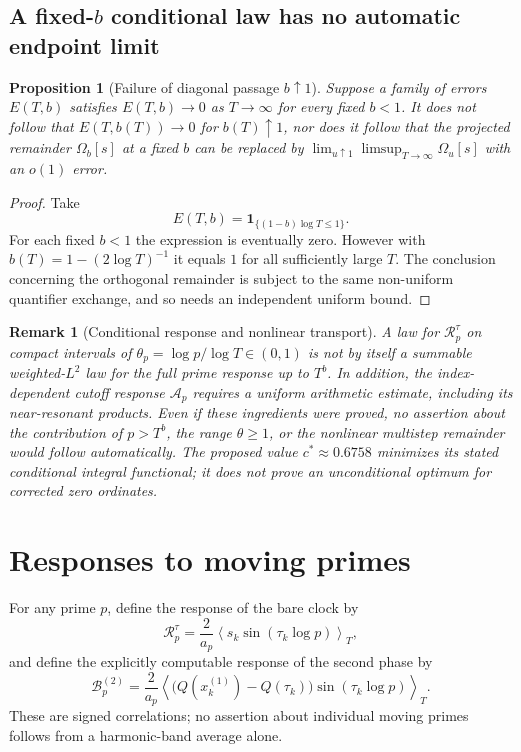 \documentclass[11pt,reqno]{amsart}
\numberwithin{equation}{section}
\newtheorem{proposition}[theorem]{Proposition}
\newtheorem{remark}[theorem]{Remark}
\newcommand{\av}[1]{\left\langle #1\right\rangle_T}
\begin{document}
\subsection{A fixed-$b$ conditional law has no automatic endpoint limit}
\begin{proposition}[Failure of diagonal passage $b\uparrow1$]
\label{prop:bendpoint}
Suppose a family of errors $E(T,b)$ satisfies
$E(T,b)\to0$ as $T\to\infty$ for every \emph{fixed} $b<1$.
It does not follow that $E(T,b(T))\to0$ for
$b(T)\uparrow1$, nor does it follow that the projected
remainder $\Omega_b[s]$ at a fixed $b$ can be replaced by
$\lim_{u\uparrow1}\limsup_{T\to\infty}\Omega_u[s]$ with
an $o(1)$ error.
\end{proposition}
\begin{proof}
Take
\[
E(T,b)=\mathbf1_{\{(1-b)\log T\le1\}}.
\]
For each fixed $b<1$ the expression is eventually zero.
However with $b(T)=1-(2\log T)^{-1}$ it equals $1$ for
all sufficiently large $T$. The conclusion concerning the
orthogonal remainder is subject to the same non-uniform
quantifier exchange, and so needs an independent uniform bound.
\end{proof}
\begin{remark}[Conditional response and nonlinear transport]
A law for $\mathcal R_p^\tau$ on compact intervals of
$\theta_p=\log p/\log T\in(0,1)$ is not by itself a
summable weighted-$L^2$ law for the full prime response up to
$T^b$. In addition, the index-dependent cutoff response
$\mathcal A_p$ requires a uniform arithmetic estimate, including
its near-resonant products. Even if these ingredients were proved,
no assertion about the contribution of $p>T^b$, the range
$\theta\ge1$, or the nonlinear multistep remainder would follow
automatically. The proposed value $c^*\approx0.6758$
minimizes its stated \emph{conditional integral functional};
it does not prove an unconditional optimum for corrected zero ordinates.
\end{remark}

\section{Responses to moving primes}\label{sec:responses}
For any prime $p$, define the response of the bare clock by
\begin{equation}\label{eq:Rresponse}
\mathcal R_p^\tau
=\frac2{a_p}\av{s_k\sin(\tau_k\log p)},
\end{equation}
and define the explicitly computable response of the second
phase by
\begin{equation}\label{eq:Bresponse}
\mathcal B_p^{(2)}
=\frac2{a_p}\av{\bigl(Q(x_k^{(1)})-Q(\tau_k)\bigr)
\sin(\tau_k\log p)}.
\end{equation}
These are signed correlations; no assertion about individual
moving primes follows from a harmonic-band average alone.
\end{document}
